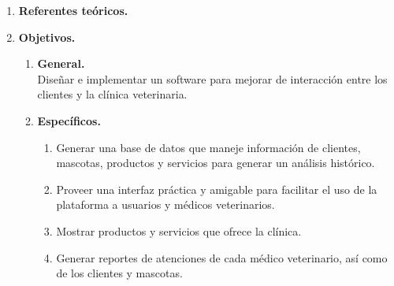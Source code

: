 \documentclass[12pt,a4paper,oneside]{book}
\begin{document}
\begin{enumerate}
\begin{enumerate}
\begin{enumerate}
						\item \textbf{¿Por qu\'e es importante este trabajo de unidad?}\\
						
						Porque mejora el actual c\'odigo fuente y como consecuencia aumenta el rendimiento del sistema. \\
						
					\end{enumerate}
					
					\item \textbf{Alcance.}
					
						\begin{itemize}
							\item El Sistema contará con una base de datos ,en la nube.
							\item El Sistema contará de un control de Registros.
							\item Contará con reportes de Servicios.
							
						\end{itemize}
				\end{enumerate}
		\item \textbf{Referentes te\'oricos. } 
		
		\item \textbf{Objetivos. } 
				\begin{enumerate}
					\item \textbf{General.} \\
						Dise\~nar e implementar un software para mejorar de interacci\'on entre los clientes y la cl\'inica veterinaria.	
						
					\item \textbf{Espec\'ificos.}
					
					\begin{enumerate}
						
						\item Generar una base de datos que maneje informaci\'on de clientes, mascotas, productos y servicios para generar un an\'alisis hist\'orico.
						\item Proveer una interfaz pr\'actica y amigable para facilitar el uso de la plataforma a usuarios y m\'edicos veterinarios.
						\item Mostrar productos y servicios que ofrece la cl\'inica.
						\item Generar reportes de atenciones de cada m\'edico veterinario, as\'i como de los clientes y mascotas.
						
					\end{enumerate}
					

\end{enumerate}
\end{enumerate}
\end{document}
